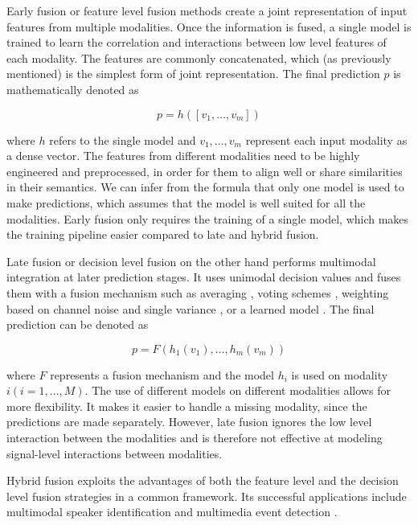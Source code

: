 \documentclass{article}
\begin{document}
Early fusion or feature level fusion methods create a joint representation of input features from multiple modalities. Once the information is fused, a single model is trained to learn the correlation and interactions between low level features of each modality. The features are commonly concatenated, which (as previously mentioned) is the simplest form of joint representation. The final prediction $p$ is mathematically denoted as

\begin{equation}
p = h([v_1, \dots , v_m])
\end{equation}

where $h$ refers to the single model and $ v_1, \dots , v_m$ represent each input modality as a dense vector. The features from different modalities need to be highly engineered and preprocessed, in order for them to align well or share similarities in their semantics. We can infer from the formula that only one model is used to make predictions, which assumes that the model is well suited for all the modalities. Early fusion only requires the training of a single model, which makes the training pipeline easier compared to late and hybrid fusion.

Late fusion or decision level fusion on the other hand performs multimodal integration at later prediction stages. It uses unimodal decision values and fuses them with a fusion mechanism such as averaging \citep{shutova2016black}, voting schemes \citep{morvant2014vote}, weighting based on channel noise \citep{potamianos2003noise} and single variance \citep{evangelopoulos2013variance}, or a learned model \citep{glodek2011learned, ramirez2011learned}. The final prediction can be denoted as

\begin{equation}
p = F(h_1(v_1), \dots , h_m(v_m))
\end{equation}

where $F$ represents a fusion mechanism and the model $h_i$ is used on modality $ i (i = 1, \dots , M)$. The use of different models on different modalities allows for more flexibility. It makes it easier to handle a missing modality, since the predictions are made separately. However, late fusion ignores the low level interaction between the modalities and is therefore not effective at modeling signal-level interactions between modalities.

Hybrid fusion exploits the advantages of both the feature level and the decision level fusion strategies in a common framework. Its successful applications include multimodal speaker identification \citep{wu2005speaker} and multimedia event detection \citep{lan2014multimedia}.
\end{document}
